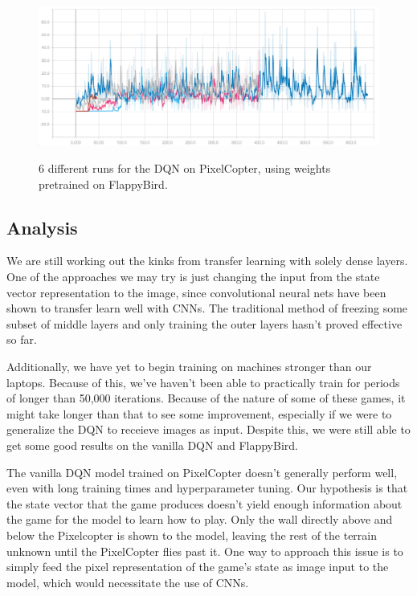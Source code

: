 \documentclass{article}
\begin{document}
\begin{figure}[h!]
\includegraphics[width=\textwidth]{pixelcopter-transfer}
\label{fig:transfer-training}
\caption{6 different runs for the DQN on PixelCopter, using weights pretrained on FlappyBird.}
\end{figure}


\subsection{Analysis}
We are still working out the kinks from transfer learning with solely dense layers. 
One of the approaches we may try is just changing the input from the state vector representation to the image, since convolutional neural nets have been shown to transfer learn well with CNNs.
The traditional method of freezing some subset of middle layers and only training the outer layers hasn't proved effective so far.

Additionally, we have yet to begin training on machines stronger than our laptops.
Because of this, we've haven't been able to practically train for periods of longer than 50,000 iterations.
Because of the nature of some of these games, it might take longer than that to see some improvement, especially if we were to generalize the DQN to receieve images as input.
Despite this, we were still able to get some good results on the vanilla DQN and FlappyBird.

The vanilla DQN model trained on PixelCopter doesn't generally perform well, even with long training times and hyperparameter tuning.
Our hypothesis is that the state vector that the game produces doesn't yield enough information about the game for the model to learn how to play. 
Only the wall directly above and below the Pixelcopter is shown to the model, leaving the rest of the terrain unknown until the PixelCopter flies past it.
One way to approach this issue is to simply feed the pixel representation of the game's state as image input to the model, which would necessitate the use of CNNs.
\end{document}
